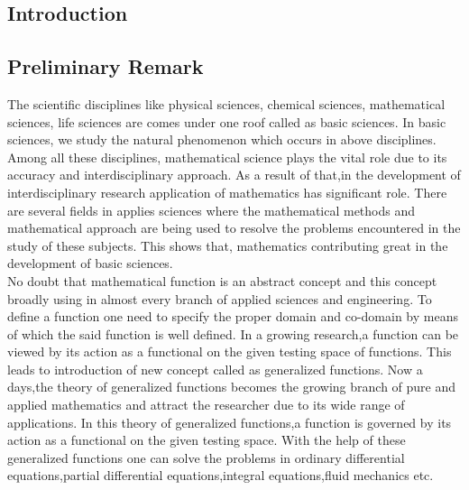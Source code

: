 \newpage
\def\baselinestretch{1.80}
\begin{large}
\pagestyle{fancy}
\renewcommand{\sectionmark}[1]{\markright{#1}}
 \chead{}
\renewcommand{\headrulewidth}{0.01pt}
\renewcommand{\footrulewidth}{0.01pt}

\chapter{Introduction}
\section{Preliminary Remark}
The scientific disciplines like physical sciences, chemical sciences, mathematical sciences, life sciences are comes under one roof called as basic sciences. In basic sciences, we study the natural phenomenon which occurs in above disciplines. Among all these disciplines, mathematical science plays the vital role due to its accuracy and interdisciplinary approach. As a result of that,in the development of interdisciplinary research application of mathematics has significant role. There are several fields in applies sciences where the mathematical methods and mathematical approach are being used to resolve the problems encountered in the study of these subjects. This shows that, mathematics contributing great in the development of basic sciences.\\

No doubt that mathematical function is an abstract concept and this concept broadly using in almost every branch of applied sciences and engineering. To define a function one need to specify the proper domain and co-domain by means of which the said function is well defined. In a growing  research,a function can be viewed by its action as a functional on the given testing space of functions. This leads to introduction of new concept called as generalized functions. Now a days,the theory of generalized functions becomes the growing branch of pure and applied mathematics and attract the researcher due to its wide range of applications. In this theory of generalized functions,a function is governed by its action as a functional on the given testing space. With the help of these generalized functions one can solve the problems in ordinary differential equations,partial differential equations,integral equations,fluid mechanics etc.


\end{large}
